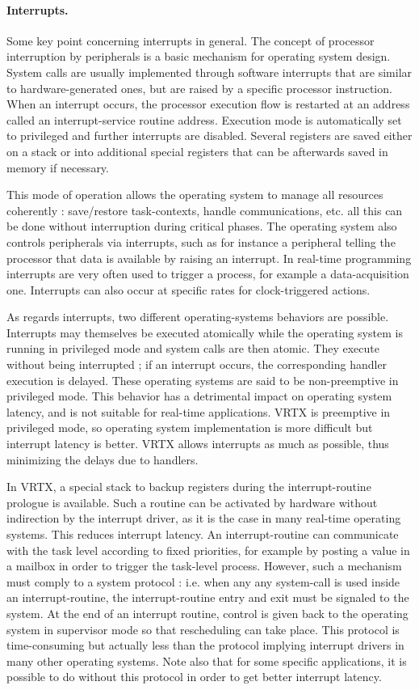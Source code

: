 \documentclass[10pt]{report}
\begin{document}
\paragraph{Interrupts.} Some key point concerning interrupts in general. The concept of
processor interruption by peripherals is a basic mechanism for
operating system design. System calls are usually implemented
through software interrupts that are similar to
hardware-generated ones, but are raised by a specific processor
instruction. When an interrupt occurs, the processor execution
flow is restarted at an address called an interrupt-service
routine address. Execution mode is automatically set to
privileged and further interrupts are disabled. Several registers
are saved either on a stack or into additional special registers
that can be afterwards saved in memory if necessary.

This mode of operation allows the operating system to manage all
resources coherently : save/restore task-contexts, handle
communications, etc. all this can be done without interruption
during critical phases. The operating system also controls
peripherals via interrupts, such as for instance a peripheral
telling the processor that data is available by raising an
interrupt. In real-time programming interrupts are very often
used to trigger a process, for example a data-acquisition one.
Interrupts can also occur at specific rates for clock-triggered
actions.

As regards interrupts, two different operating-systems behaviors
are possible. Interrupts may themselves be executed atomically while
the operating system is running in privileged mode and system
calls are then atomic. They execute without being interrupted ;
if an interrupt occurs, the corresponding handler execution is
delayed. These operating systems are said to be non-preemptive in
privileged mode. This behavior has a detrimental impact on
operating system latency, and is not suitable for real-time
applications. VRTX is preemptive in privileged mode, so operating
system implementation is more difficult but interrupt latency is
better. VRTX allows interrupts as much as possible, thus minimizing 
the delays due to handlers.

In VRTX, a special stack to backup registers during the 
interrupt-routine prologue is available. Such a routine can be
activated by hardware without indirection by the interrupt
driver, as it is the case in many real-time operating systems.
This reduces interrupt latency. An interrupt-routine can
communicate with the task level according to fixed priorities,
for example by posting a value in a mailbox in order to trigger the
task-level process. However, such a mechanism must comply to a
system protocol : i.e. when any any system-call is used inside an
interrupt-routine, the interrupt-routine entry and exit must be
signaled to the system. At the end of an interrupt routine, control
is given back to the operating system in supervisor mode so that
rescheduling can take place. This protocol is time-consuming but
actually less than the protocol implying interrupt drivers in
many other operating systems. Note also that for some specific
applications, it is possible to do without this protocol in order
to get better interrupt latency.
\end{document}
